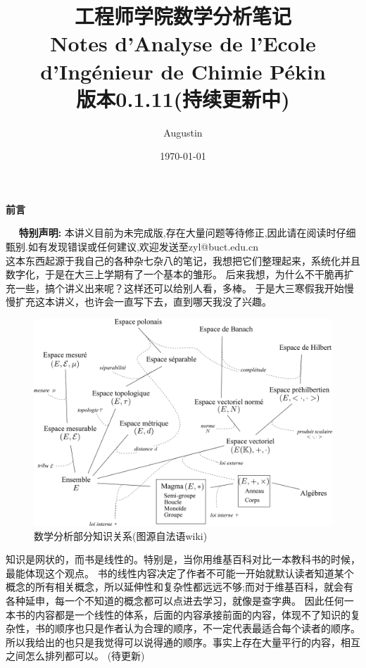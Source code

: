 \documentclass[12pt, a4paper, oneside]{ctexbook}
\title{{\Huge{\textbf{工程师学院数学分析笔记\\Notes d'Analyse de l'Ecole d'Ingénieur de Chimie Pékin}}}\\
版本0.1.11(持续更新中)}
\author{Augustin}
\date{\today}
\begin{document}
\maketitle

\setcounter{page}{1}

\begin{center}
    \Huge\textbf{前言}
\end{center}~\
\noindent
\textbf{特别声明:}
本讲义目前为未完成版,存在大量问题等待修正,因此请在阅读时仔细甄别.如有发现错误或任何建议,欢迎发送至zyl@buct.edu.cn\\


\indent
这本东西起源于我自己的各种杂七杂八的笔记，我想把它们整理起来，系统化并且数字化，于是在大三上学期有了一个基本的雏形。
后来我想，为什么不干脆再扩充一些，搞个讲义出来呢？这样还可以给别人看，多棒。
于是大三寒假我开始慢慢扩充这本讲义，也许会一直写下去，直到哪天我没了兴趣。

\begin{figure}[H]%
  \centering
  \includegraphics[scale=0.5]{abstract.png}
  \caption{数学分析部分知识关系(图源自法语wiki)}
  \label{myref:abstract}
\end{figure}

知识是网状的，而书是线性的。特别是，当你用维基百科对比一本教科书的时候，最能体现这个观点。
书的线性内容决定了作者不可能一开始就默认读者知道某个概念的所有相关概念，所以延伸性和复杂性都远远不够;而对于维基百科，就会有各种延申，每一个不知道的概念都可以点进去学习，就像是查字典。
因此任何一本书的内容都是一个线性的体系，后面的内容承接前面的内容，体现不了知识的复杂性，书的顺序也只是作者认为合理的顺序，不一定代表最适合每个读者的顺序。
所以我给出的也只是我觉得可以说得通的顺序。事实上存在大量平行的内容，相互之间怎么排列都可以。
(待更新)
\end{document}
